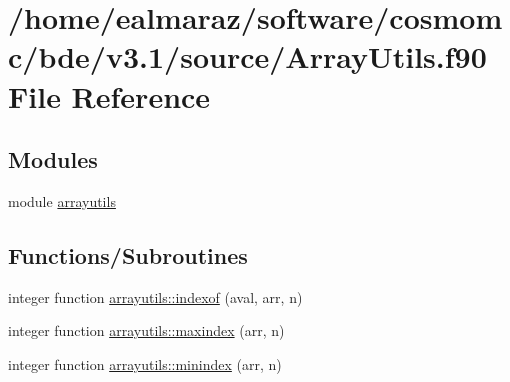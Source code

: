 \hypertarget{ArrayUtils_8f90}{}\section{/home/ealmaraz/software/cosmomc/bde/v3.1/source/\+Array\+Utils.f90 File Reference}
\label{ArrayUtils_8f90}
\subsection*{Modules}
\begin{DoxyCompactItemize}
\item 
module \mbox{\hyperlink{namespacearrayutils}{arrayutils}}
\end{DoxyCompactItemize}
\subsection*{Functions/\+Subroutines}
\begin{DoxyCompactItemize}
\item 
integer function \mbox{\hyperlink{namespacearrayutils_aa1aa3daae226441732e2e7c4f292eab2}{arrayutils\+::indexof}} (aval, arr, n)
\item 
integer function \mbox{\hyperlink{namespacearrayutils_ad2c5184ac408d5a352ea420ff3f1e1eb}{arrayutils\+::maxindex}} (arr, n)
\item 
integer function \mbox{\hyperlink{namespacearrayutils_aba5bf237d7739646abd0596fea043455}{arrayutils\+::minindex}} (arr, n)
\end{DoxyCompactItemize}
